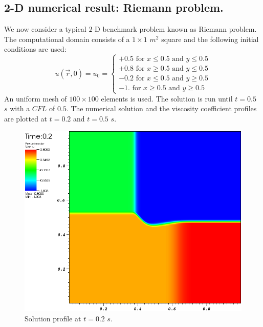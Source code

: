 \subsection{2-D numerical result: Riemann problem.}\label{sec:2dnum_sct2b}
%
We now consider a typical $2$-D benchmark problem known as Riemann problem. The computational domain consists of a $1 \times 1$ $m^2$ square and the following initial conditions are used:
%
\begin{equation}\label{eq:bg_2d_ic_sct2b}
u(\vec{r},0) = u_0 = \left\{
\begin{array}{l}
+0.5 \text{ for } x \leq 0.5 \text{ and } y \leq 0.5 \\
+0.8 \text{ for } x \geq 0.5 \text{ and } y \leq 0.5 \\
-0.2 \text{ for } x \leq 0.5 \text{ and } y \geq 0.5 \\
-1. \text{ for } x \geq 0.5 \text{ and } y \geq 0.5
\end{array}
\nonumber
\right.
\end{equation}
%
An uniform mesh of $100 \times 100$ elements is used. The solution is run until $t=0.5$ $s$ with a $CFL$ of $0.5$. The numerical solution and the viscosity coefficient profiles are plotted at $t=0.2$ and $t=0.5$ $s$. 
%
\begin{figure}[H]
	\centering
	\includegraphics[width=\textwidth]{figures/Burger2D_sol_t0p2.png}
	\caption{Solution profile at $t=0.2$ $s$.}
	\label{fig:2d_burger_sol_t0p2}
\end{figure}
%

